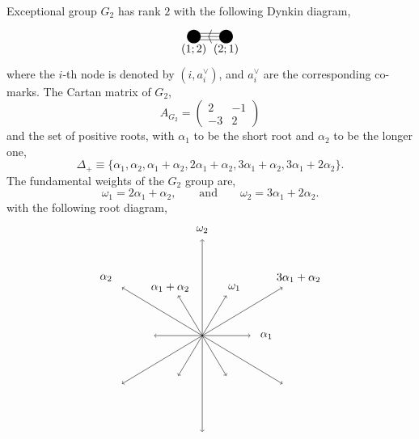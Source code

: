 \documentclass[a4paper,12pt]{article}
\begin{document}
Exceptional group $G_2$ has rank $2$ with the following Dynkin diagram, 
%
\begin{equation*}
	    \begin{tikzpicture}                             %
		\draw (-0.5, 0) -- (0.5,0);
		\draw (-0.5, 0.1) -- (0.5,0.1);
        \draw (-0.5, -0.1) -- (0.5,-0.1);
		\node[circle,fill=black,inner sep=1.5mm] at (-0.5,0) {};
        \node[circle,fill=black,inner sep=1.5mm] at (0.5,0) {};
		\node at (0, 0) {$\big{<}$};
        \node at (-0.5, -0.4) {$(1;2)$};
        \node at (0.5, -0.4) {$(2;1)$};
	\end{tikzpicture}
 \end{equation*}
 where the $i$-th node is denoted by $(i,a_i^\vee)$, and $a_i^\vee$ are the corresponding co-marks. The Cartan matrix of $G_2$,
 \begin{equation}
    A_{G_2}=\begin{pmatrix}
2 & -1\\
-3 & 2
\end{pmatrix}
 \end{equation}
 and the set of positive roots, with $\alpha_1$ to be the short root and $\alpha_2$ to be the longer one,
 \begin{equation}
     {\Delta}_+\equiv \{\alpha_1,\alpha_2,\alpha_1+\alpha_2,2\alpha_1+\alpha_2,3\alpha_1+\alpha_2,3\alpha_1+2\alpha_2\}.
 \end{equation}
 The fundamental weights of the $G_2$ group are,
 \begin{equation}
     \omega_1=2\alpha_1+\alpha_2, \qquad \mathrm{and} \qquad \omega_2=3\alpha_1+2\alpha_2.
 \end{equation}
with the following root diagram,
 \begin{equation*}
	    \begin{tikzpicture}                             
		\draw[->] (0, 0) -- (-0.75,1.25);
		\draw[->] (0, 0) -- (0.75,1.25);
        \draw[->] (0, 0) -- (-0.75,-1.25);
		\draw[->] (0, 0) -- (0.75,-1.25);
        \draw[->] (0, 0) -- (-1.5,0);
        \draw[->] (0, 0) -- (1.5,0);
        \draw[->] (0, 0) -- (0,3);
        \draw[->] (0, 0) -- (0,-3);
        \draw[->] (0, 0) -- (2.5,-1.5);
        \draw[->] (0, 0) -- (2.5,1.5);
        \draw[->] (0, 0) -- (-2.5,1.5);
        \draw[->] (0, 0) -- (-2.5,-1.5);
        \node at (2, 0) {$\alpha_1$};
        \node at (-3, 1.8) {$\alpha_2$};
        \node at (3, 1.8) {$3\alpha_1+\alpha_2$};
        \node at (-1, 1.5) {$\alpha_1+\alpha_2$};
        \node at (1, 1.5) {$\omega_1$};
        \node at (0, 3.3) {$\omega_2$};
	\end{tikzpicture}
 \end{equation*}
\end{document}
